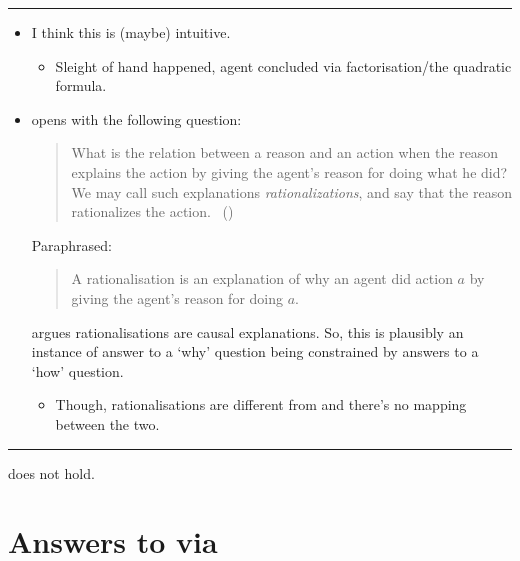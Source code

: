 \documentclass[10pt]{article}
\newcommand\lLine{{\color{lightgray} \noindent\rule{\textwidth}{0.4pt}}}
\newcommand\sepLine{
  \vfill
  \par\noindent\rule{\textwidth}{0.4pt}
  \vfill}
\begin{document}
\lLine

\begin{note}
  \begin{itemize}
  \item
    I think this is (maybe) intuitive.
    \begin{itemize}
    \item
      Sleight of hand happened, agent concluded via factorisation/the quadratic formula.
    \end{itemize}
  \item
    \citeauthor{Davidson:1963aa} opens  with the following question:

    \begin{quote}
      What is the relation between a reason and an action when the reason explains the action by giving the agent's reason for doing what he did?
      We may call such explanations \emph{rationalizations}, and say that the reason rationalizes the action.%
      \mbox{ }\hfill\mbox{(\citeyear[685]{Davidson:1963aa})}
    \end{quote}

    Paraphrased:
    \begin{quote}
      A rationalisation is an explanation of why an agent did action \(a\) by giving the agent's reason for doing \(a\).
    \end{quote}
    \citeauthor{Davidson:1963aa} argues rationalisations are causal explanations.
    So, this is plausibly an instance of answer to a `why' question being constrained by answers to a `how' question.
    \begin{itemize}
    \item
      Though, rationalisations are different from  and there's no mapping between the two.
    \end{itemize}
  \end{itemize}
\end{note}

\sepLine

\begin{note}
  \begin{thesis}
    \issueInclusion{} does not hold.
  \end{thesis}
\end{note}

\vfill


\newpage

\section{Answers to \qWhy{} via }
\label{sec:answers-qwhy}
\end{document}
